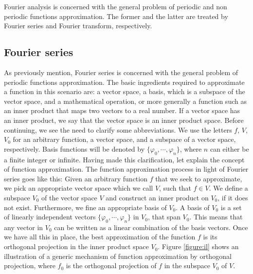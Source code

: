 \documentclass[../Main/thesis.tex]{subfiles}
\begin{document}
\justify
Fourier analysis is concerned with the general problem of periodic and non periodic functions approximation. The former and the latter are treated by Fourier series and Fourier transform, respectively. %

\subsection{Fourier series}
As previously mention, Fourier series is concerned with the general problem of periodic functions approximation. The basic ingredients required to approximate a function in this scenario are: a vector space, a basis, which is a subspace of the vector space, and a mathematical operation, or more generally a function such as an inner product that maps two vectors to a real number. If a vector space has an inner product, we say that the vector space is an inner product space. 
\justify
Before continuing, we see the need to clarify some abbreviations. We use the letters $f$, $V$, $V_{0}$ for an arbitrary function, a vector space, and a subspace of a vector space, respectively.
Basis functions will be denoted by $\{  \varphi_{0}, \cdots,\varphi_{n}\}$, where $n$ can either be a finite integer or infinite. Having made this clarification, let explain the concept of function approximation. 
\justify
The function approximation process in light of Fourier series goes like this: Given an arbitrary function $f$ that we seek to approximate, we pick an appropriate vector space which we call $V$, such that $f\in V$. We define a subspace $V_{0}$ of the vector space $V$ and construct an inner product on $V_{0}$, if it does not exist. Furthermore, we fine an appropriate basis of $V_{0}$.  A basis of $V_{0}$ is a set of linearly independent vectors   $\{  \varphi_{0}, \cdots,\varphi_{n}\}$ in $V_{0}$, that span $V_{0}$. 
\justify
This means that any vector in $V_{0}$ can be written as a linear combination of the basis vectors. Once we have all this in place, the best approximation of the function $f$ is its orthogonal projection in the inner product space $V_{0}$. Figure \ref{figure:il} shows an illustration of a generic mechanism of function approximation by orthogonal projection, where $f_{0}$ is the orthogonal projection of $f$ in the subspace $V_{0}$ of $V$.
\end{document}
